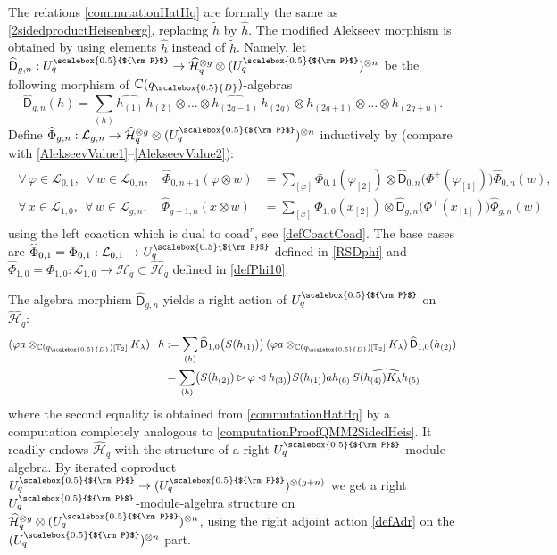 \documentclass[11pt]{amsart}
\newcommand{\qD}{q_{\scalebox{0.5}{D}}}
\newcommand{\Pup}{{\scalebox{0.5}{${\rm P}$}}}
\begin{document}
\indent The relations \eqref{commutationHatHq} are formally the same as \eqref{2sidedproductHeisenberg}, replacing $\widetilde{h}$ by $\widehat{h}$. The modified Alekseev morphism is obtained by using elements $\widehat{h}$ instead of $\widetilde{h}$. Namely, let $\widehat{\mathsf{D}}_{g,n} : U_q^\Pup \to \widehat{\mathcal{H}}_q^{\otimes g} \otimes (U_q^\Pup)^{\otimes n}$ be the following morphism of $\mathbb{C}(\qD)$-algebras
\begin{equation}\label{dressingMap2}
\widehat{\mathsf{D}}_{g,n}(h) = \sum_ {(h)} \widehat{h_{(1)}}\,h_{(2)} \otimes \ldots \otimes \widehat{h_{(2g-1)}}\,h_{(2g)} \otimes h_ {(2g+1)} \otimes \ldots \otimes h_{(2g+n)}.
\end{equation}
Define $\widehat{\Phi}_{g,n} : \mathcal{L}_{g,n} \to \widehat{\mathcal{H}}_q^{\otimes g} \otimes (U_q^\Pup)^{\otimes n}$ inductively by (compare with \eqref{AlekseevValue1}--\eqref{AlekseevValue2}):
\begin{align}
\begin{split}\label{modifiedAlekseevValue}
\forall \, \varphi \in \mathcal{L}_{0,1}, \:\: \forall \, w \in \mathcal{L}_{0,n}, \quad\widehat{\Phi}_{0,n+1}(\varphi \otimes w) &=  \sum_{[\varphi]} \Phi_{0,1}(\varphi_{[2]}) \otimes \widehat{\mathsf{D}}_{0,n}\bigl( \Phi^+(\varphi_{[1]}) \bigr)\widehat{\Phi}_{0,n}(w),\\
\forall \, x \in \mathcal{L}_{1,0}, \:\: \forall \, w \in \mathcal{L}_{g,n}, \quad \widehat{\Phi}_{g+1,n}(x \otimes w) &=  \sum_{[x]} \Phi_{1,0}(x_{[2]}) \otimes \widehat{\mathsf{D}}_{g,n}\bigl( \Phi^+(x_{[1]}) \bigr) \widehat{\Phi}_{g,n}(w)
\end{split}
\end{align}
using the left coaction which is dual to $\mathrm{coad}^r$, see \eqref{defCoactCoad}. The base cases are $\widehat{\Phi}_{0,1} = \Phi_{0,1} : \mathcal{L}_{0,1} \to U_q^\Pup$ defined in \eqref{RSDphi} and $\widehat{\Phi}_{1,0} = \Phi_{1,0} : \mathcal{L}_{1,0} \to \mathcal{H}_q \subset \widehat{\mathcal{H}}_q$ defined in \eqref{defPhi10}.

\smallskip

\indent The algebra morphism $\widehat{\mathsf{D}}_{g,n}$ yields a right action of $U_q^\Pup$ on $\widehat{\mathcal{H}}_q$:
\begin{align*}
(\varphi a \otimes_{\mathbb{C}(\qD)[\mathbb{T}_2]} K_\lambda) \cdot h &:= \sum_{(h)} \widehat{\mathsf{D}}_{1,0}\bigl( S(h_{(1)}) \bigr) \,  (\varphi a \otimes_{\mathbb{C}(\qD)[\mathbb{T}_2]} K_\lambda) \, \widehat{\mathsf{D}}_{1,0}(h_{(2)})\\
&=\sum_{(h)} \bigl( S(h_{(2)}) \rhd \varphi \lhd h_{(3)} \bigr) S(h_{(1)})a h_{(6)} \, \widehat{S(h_{(4)}) K_\lambda h_{(5)}}
\end{align*}
where the second equality is obtained from \eqref{commutationHatHq} by a computation completely analogous to \eqref{computationProofQMM2SidedHeis}. It readily endows $\widehat{\mathcal{H}}_q$ with the structure of a right $U_q^\Pup$-module-algebra. By iterated coproduct $U_q^\Pup \to (U_q^\Pup)^{\otimes (g+n)}$ we get a right $U_q^\Pup$-module-algebra structure on $\widehat{\mathcal{H}}_q^{\otimes g} \otimes (U_q^\Pup)^{\otimes n}$, using the right adjoint action \eqref{defAdr} on the $(U_q^\Pup)^{\otimes n}$ part.
\end{document}
